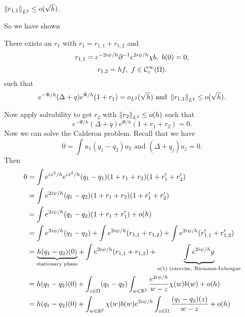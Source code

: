 \begin{prop}
  $\left\lVert r_{1,1} \right\rVert_{L^2} \leq o(\sqrt h)$.
\end{prop}

So we have shown
\begin{prop}
  There exists an $r_1$ with $r_1=r_{1,1}+r_{1,2}$ and
  \[ r_{1,1} = e^{-2i\psi/h}\partial^{-1} e^{2i\psi/h}\chi b, \ b(0)=0, \]
  \[ r_{1,2} = hf, \ f \in \mathcal{C}_c^\infty(\Omega). \]
  such that 
  \[ e^{-\Phi/h}(\Delta+q)e^{\Phi/h}(1+r_1)=o_{L^2}(\sqrt{h}) \text{ and } \left\lVert r_{1,1} \right\rVert_{L^2} \leq o(\sqrt h). \]
\end{prop}

Now apply solvability to get $r_2$ with $\left\lVert r_2 \right\rVert_{L^2} \leq o(h)$ such that
\[ e^{-\Phi/h}(\Delta+q)e^{\Phi/h}(1+r_1+r_2)=0. \]
Now we can solve the Calderon problem.
Recall that we have
\[ 0 = \int u_1(q_1-q_2)u_2 \text{ and } (\Delta+q_j)u_j=0. \]
Then
\begin{align*}
  0 &= \int e^{iz^2/h}e^{i\bar z^2/h} (q_1-q_1)(1+r_1+r_2)(1+r_1'+r_2') \\
  &= \int e^{2i\psi/h}(q_1-q_2)(1+r_1+r_2)(1+r_1'+r_2') \\
  &= \int e^{2i\psi/h}(q_1-q_2)(1+r_1+r_1') + o(h) \\
  &= \int e^{2i\psi/h}(q_1-q_2) + \int e^{2i\psi/h}(r_{1,1}+r_{1,2}) + \int e^{2i\psi/h}(r_{1,1}'+r_{1,2}') \\
  &= \underbrace{h(q_1-q_2)(0)}_{\text{stationary phase}} + \int e^{2i\psi/h}(r_{1,1}+r_{1,2}) + \underbrace{\int e^{2i\psi/h}g}_{o(1)\text{ (exercise, Riemann-Lebesgue}} \\
    &= h(q_1-q_2)(0) + \int_{z\in\Omega} (q_1-q_2) \int_{w \in \mathbb{R}^2} \frac{e^{2i\psi/h}}{w-z} \chi(w)b(w) + o(h) \\
    &= h(q_1-q_2)(0) + \int_{w \in \mathbb{R}^2} \chi(w)b(w) e^{2i\psi/h} \int_{z \in \Omega} \frac{(q_1-q_2)(z)}{w-z} + o(h)
\end{align*}
